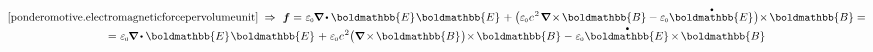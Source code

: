 \nopagebreak\vspace{-1.2em}\begin{multline*}
\eqref{ponderomotive.electromagneticforcepervolumeunit}
\hspace{.27em}\Rightarrow\hspace{.35em}
\bm{f} = \hspace{.1ex} \vacuumpermittivity \hspace{-0.1ex} \boldnabla \hspace{-0.1ex} \dotp \boldmathbb{E} \hspace{.16ex} \boldmathbb{E} \hspace{.2ex}
+ \bigl( \vacuumpermittivity \hspace{.1ex} c^{\hspace{.16ex}2} \hspace{.22ex} \boldnabla \hspace{-0.2ex} \times \hspace{-0.2ex} \boldmathbb{B} - \vacuumpermittivity \hspace{.1ex} \mathdotabove{\boldmathbb{E}} \hspace{.1ex} \bigr) \hspace{-0.44ex} \times \hspace{-0.2ex} \boldmathbb{B} =
\\[-0.15em]
%
= \hspace{.1ex} \vacuumpermittivity \hspace{-0.1ex} \boldnabla \hspace{-0.1ex} \dotp \boldmathbb{E} \hspace{.16ex} \boldmathbb{E} \hspace{.2ex}
+ \hspace{.1ex} \vacuumpermittivity \hspace{.1ex} c^{\hspace{.16ex}2} \bigl( \boldnabla \hspace{-0.2ex} \times \hspace{-0.2ex} \boldmathbb{B} \hspace{.1ex} \bigr) \hspace{-0.44ex} \times \hspace{-0.2ex} \boldmathbb{B} \hspace{.1ex}
- \hspace{.1ex} \vacuumpermittivity \hspace{.1ex} \mathdotabove{\boldmathbb{E}} \hspace{-0.15ex} \times \hspace{-0.2ex} \boldmathbb{B}
\end{multline*}

